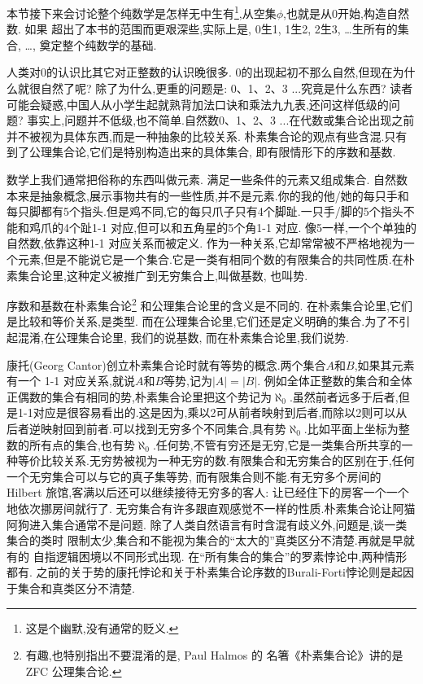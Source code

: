  {\small
 本节接下来会讨论整个纯数学是怎样无中生有\footnote{这是个幽默,没有通常的贬义.},从空集$\phi$,也就是从0开始,构造自然数. 如果
超出了本书的范围而更艰深些,实际上是, 0生1, 1生2, 2生3, \dots 生所有的集合, \dots,
奠定整个纯数学的基础.

人类对0的认识比其它对正整数的认识晚很多. 0的出现起初不那么自然,但现在为什么就很自然了呢?
除了为什么,更重的问题是: 0、1、2、3 ...究竟是什么东西?
读者可能会疑惑,中国人从小学生起就熟背加法口诀和乘法九九表,还问这样低级的问题?
事实上,问题并不低级,也不简单.自然数0、1、2、3 ...在代数或集合论出现之前并不被视为具体东西,而是一种抽象的比较关系.
朴素集合论的观点有些含混.只有到了公理集合论,它们是特别构造出来的具体集合, 
即有限情形下的序数和基数.

数学上我们通常把俗称的东西叫做元素.
满足一些条件的元素又组成集合.
自然数本来是抽象概念,展示事物共有的一些性质,并不是元素.你的我的他/她的每只手和每只脚都有5个指头.但是鸡不同,它的每只爪子只有4个脚趾.一只手/脚的5个指头不能和鸡爪的4个趾1-1 对应,但可以和五角星的5个角1-1 对应.
像5一样,一个个单独的自然数,依靠这种1-1 对应关系而被定义.
作为一种关系,它却常常被不严格地视为一个元素,但是不能说它是一个集合.它是一类有相同个数的有限集合的共同性质.在朴素集合论里,这种定义被推广到无穷集合上,叫做基数, 也叫势.

序数和基数在朴素集合论\footnote{有趣,也特别指出不要混淆的是, Paul Halmos 的
名箸《朴素集合论》\cite{HalmosP}讲的是ZFC 公理集合论.}
和公理集合论里的含义是不同的. 
在朴素集合论里,它们是比较和等价关系,是类型.
而在公理集合论里,它们还是定义明确的集合.为了不引起混淆,在公理集合论里,
我们的说基数,
而在朴素集合论里,我们说势.

康托(Georg Cantor)创立朴素集合论时就有等势的概念.两个集合$A$和$B$,如果其元素有一个 1-1 对应关系,就说$A$和$B$等势,记为$|A|=|B|$.
例如全体正整数的集合和全体正偶数的集合有相同的势,朴素集合论里把这个势记为$\aleph_0$.虽然前者远多于后者,但是1-1对应是很容易看出的.这是因为,乘以2可从前者映射到后者,而除以2则可以从后者逆映射回到前者.可以找到无穷多个不同集合,具有势$\aleph_0$.比如平面上坐标为整数的所有点的集合,也有势$\aleph_0$.任何势,不管有穷还是无穷,它是一类集合所共享的一种等价比较关系.无穷势被视为一种无穷的数.有限集合和无穷集合的区别在于,任何一个无穷集合可以与它的真子集等势, 而有限集合则不能.有无穷多个房间的Hilbert 旅馆,客满以后还可以继续接待无穷多的客人: 让已经住下的房客一个一个地依次挪房间就行了.
无穷集合有许多跟直观感觉不一样的性质.朴素集合论让阿猫阿狗进入集合通常不是问题.
除了人类自然语言有时含混有歧义外,问题是,谈一类集合的类时
限制太少,集合和不能视为集合的“太大的”真类区分不清楚.再就是早就有的
自指逻辑困境以不同形式出现.
在“所有集合的集合”的罗素悖论中,两种情形都有.
之前的关于势的康托悖论和关于朴素集合论序数的Burali-Forti悖论则是起因于集合和真类区分不清楚.

}
